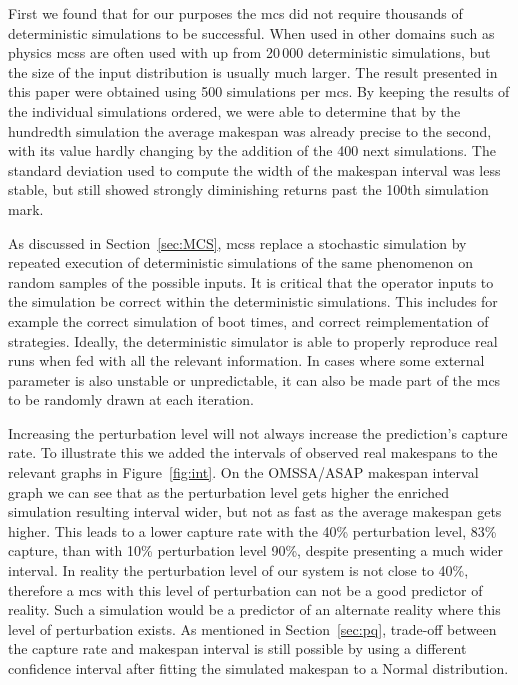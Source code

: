 \documentclass[10pt,conference,compsocconf]{IEEEtran}
\begin{document}
First we found that  for our purposes the \ac{mcs} did  not require thousands of
deterministic simulations to  be successful. When used in other  domains such as
physics \acp{mcs} are often used with up from 20\,000 deterministic simulations,
but  the size  of the  input  distribution is  usually much  larger. The  result
presented  in this  paper were obtained using  500 simulations per \ac{mcs}.  By
keeping  the results  of the  individual simulations  ordered, we  were able  to
determine  that by  the hundredth  simulation the  average makespan  was already
precise to the second, with its value hardly changing by the addition of the 400
next  simulations. The  standard  deviation used  to compute  the  width of  the
makespan interval was less stable, but still showed strongly diminishing returns
past the 100th simulation mark.

As discussed in Section~\ref{sec:MCS}, \aclp{mcs} replace a stochastic
simulation by repeated execution of deterministic simulations of the same
phenomenon on random samples of the possible inputs. It is critical that the
operator inputs to the simulation be correct within the deterministic simulations.
This includes for example the correct simulation of boot times, and correct
reimplementation of strategies. Ideally, the deterministic simulator is able to
properly reproduce real runs when fed with all the relevant information. In cases
where some external parameter is also unstable or unpredictable, it can also be
made part of the \ac{mcs} to be randomly drawn at each iteration.

Increasing the perturbation level will not always increase the prediction's
capture rate. To illustrate this we added the intervals of observed real
makespans to the relevant graphs in Figure~\ref{fig:int}. On the OMSSA/ASAP
makespan interval graph we can see that as the perturbation level gets higher
the enriched simulation resulting interval wider, but not as fast as the
average makespan gets higher. This leads to a lower capture rate with the 40\%
perturbation level, 83\% capture, than with 10\% perturbation level 90\%,
despite presenting a much wider interval. In reality the perturbation level of
our system is not close to 40\%, therefore a \ac{mcs} with this level of
perturbation can not be a good predictor of reality. Such a simulation would be
a predictor of an alternate reality where this level of perturbation exists. As
mentioned in Section~\ref{sec:pq}, trade-off between the capture rate and
makespan interval is still possible by using a different confidence
interval after fitting the simulated makespan to a Normal distribution.
\end{document}
